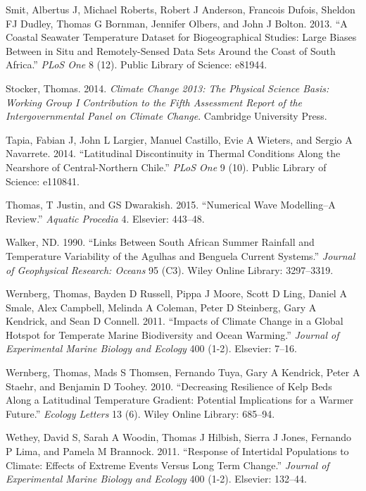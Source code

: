 \documentclass[12pt,A4paper,]{article}
\begin{document}
\hypertarget{ref-Smit2013}{}
Smit, Albertus J, Michael Roberts, Robert J Anderson, Francois Dufois,
Sheldon FJ Dudley, Thomas G Bornman, Jennifer Olbers, and John J Bolton.
2013. ``A Coastal Seawater Temperature Dataset for Biogeographical
Studies: Large Biases Between in Situ and Remotely-Sensed Data Sets
Around the Coast of South Africa.'' \emph{PLoS One} 8 (12). Public
Library of Science: e81944.

\hypertarget{ref-Stocker2014}{}
Stocker, Thomas. 2014. \emph{Climate Change 2013: The Physical Science
Basis: Working Group I Contribution to the Fifth Assessment Report of
the Intergovernmental Panel on Climate Change}. Cambridge University
Press.

\hypertarget{ref-Tapia2014}{}
Tapia, Fabian J, John L Largier, Manuel Castillo, Evie A Wieters, and
Sergio A Navarrete. 2014. ``Latitudinal Discontinuity in Thermal
Conditions Along the Nearshore of Central-Northern Chile.'' \emph{PLoS
One} 9 (10). Public Library of Science: e110841.

\hypertarget{ref-Thomas2015}{}
Thomas, T Justin, and GS Dwarakish. 2015. ``Numerical Wave Modelling--A
Review.'' \emph{Aquatic Procedia} 4. Elsevier: 443--48.

\hypertarget{ref-Walker1990}{}
Walker, ND. 1990. ``Links Between South African Summer Rainfall and
Temperature Variability of the Agulhas and Benguela Current Systems.''
\emph{Journal of Geophysical Research: Oceans} 95 (C3). Wiley Online
Library: 3297--3319.

\hypertarget{ref-Wernberg2011}{}
Wernberg, Thomas, Bayden D Russell, Pippa J Moore, Scott D Ling, Daniel
A Smale, Alex Campbell, Melinda A Coleman, Peter D Steinberg, Gary A
Kendrick, and Sean D Connell. 2011. ``Impacts of Climate Change in a
Global Hotspot for Temperate Marine Biodiversity and Ocean Warming.''
\emph{Journal of Experimental Marine Biology and Ecology} 400 (1-2).
Elsevier: 7--16.

\hypertarget{ref-Wernberg2010}{}
Wernberg, Thomas, Mads S Thomsen, Fernando Tuya, Gary A Kendrick, Peter
A Staehr, and Benjamin D Toohey. 2010. ``Decreasing Resilience of Kelp
Beds Along a Latitudinal Temperature Gradient: Potential Implications
for a Warmer Future.'' \emph{Ecology Letters} 13 (6). Wiley Online
Library: 685--94.

\hypertarget{ref-Wethey2011}{}
Wethey, David S, Sarah A Woodin, Thomas J Hilbish, Sierra J Jones,
Fernando P Lima, and Pamela M Brannock. 2011. ``Response of Intertidal
Populations to Climate: Effects of Extreme Events Versus Long Term
Change.'' \emph{Journal of Experimental Marine Biology and Ecology} 400
(1-2). Elsevier: 132--44.
\end{document}
